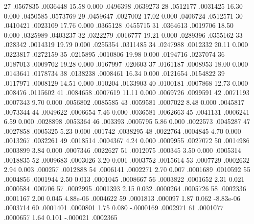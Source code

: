          27  {\VBAR}   .0567835   .0036448    15.58   0.000     .0496398    .0639273
         28  {\VBAR}   .0512177   .0031425    16.30   0.000     .0450585    .0573769
         29  {\VBAR}   .0459647   .0027002    17.02   0.000     .0406724    .0512571
         30  {\VBAR}   .0410421   .0023109    17.76   0.000     .0365128    .0455715
         31  {\VBAR}   .0364613   .0019706    18.50   0.000     .0325989    .0403237
         32  {\VBAR}   .0322279   .0016777    19.21   0.000     .0289396    .0355162
         33  {\VBAR}    .028342   .0014319    19.79   0.000     .0255354    .0311485
         34  {\VBAR}   .0247988   .0012332    20.11   0.000     .0223817    .0272159
         35  {\VBAR}   .0215895   .0010806    19.98   0.000     .0194716    .0237074
         36  {\VBAR}   .0187013   .0009702    19.28   0.000     .0167997     .020603
         37  {\VBAR}   .0161187   .0008953    18.00   0.000     .0143641    .0178734
         38  {\VBAR}   .0138238   .0008461    16.34   0.000     .0121654    .0154822
         39  {\VBAR}   .0117971   .0008129    14.51   0.000      .010204    .0133903
         40  {\VBAR}   .0100181   .0007868    12.73   0.000      .008476    .0115602
         41  {\VBAR}   .0084658   .0007619    11.11   0.000     .0069726    .0099591
         42  {\VBAR}   .0071193   .0007343     9.70   0.000     .0056802    .0085585
         43  {\VBAR}   .0059581   .0007022     8.48   0.000     .0045817    .0073344
         44  {\VBAR}   .0049622   .0006654     7.46   0.000     .0036581    .0062663
         45  {\VBAR}   .0041131   .0006241     6.59   0.000     .0028898    .0053364
         46  {\VBAR}    .003393   .0005795     5.86   0.000     .0022573    .0045287
         47  {\VBAR}   .0027858   .0005325     5.23   0.000      .001742    .0038295
         48  {\VBAR}   .0022764   .0004845     4.70   0.000     .0013267    .0032261
         49  {\VBAR}   .0018514   .0004367     4.24   0.000     .0009955    .0027072
         50  {\VBAR}   .0014986   .0003899     3.84   0.000     .0007346    .0022627
         51  {\VBAR}   .0012075    .000345     3.50   0.000     .0005314    .0018835
         52  {\VBAR}   .0009683   .0003026     3.20   0.001     .0003752    .0015614
         53  {\VBAR}   .0007729   .0002632     2.94   0.003      .000257    .0012888
         54  {\VBAR}   .0006141   .0002271     2.70   0.007     .0001689    .0010592
         55  {\VBAR}   .0004856   .0001944     2.50   0.013     .0001045    .0008667
         56  {\VBAR}   .0003822   .0001652     2.31   0.021     .0000584     .000706
         57  {\VBAR}   .0002995   .0001393     2.15   0.032     .0000264    .0005726
         58  {\VBAR}   .0002336   .0001167     2.00   0.045     4.88e-06    .0004622
         59  {\VBAR}   .0001813    .000097     1.87   0.062    -8.83e-06    .0003714
         60  {\VBAR}   .0001401   .0000801     1.75   0.080    -.0000169    .0002971
         61  {\VBAR}   .0001077   .0000657     1.64   0.101     -.000021    .0002365
{\smallskip}
